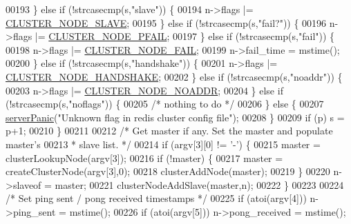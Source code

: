 \begin{DoxyCode}
{{00193             \} \textcolor{keywordflow}{else} \textcolor{keywordflow}{if} (!strcasecmp(s,\textcolor{stringliteral}{"slave"})) \{
00194                 n->flags |= \hyperlink{cluster_8h_a34b7bfd1f810397be68c3b5d13d4d134}{CLUSTER\_NODE\_SLAVE};
00195             \} \textcolor{keywordflow}{else} \textcolor{keywordflow}{if} (!strcasecmp(s,\textcolor{stringliteral}{"fail?"})) \{
00196                 n->flags |= \hyperlink{cluster_8h_a5306c1ae8988b8be0a1a02bd9162dfa1}{CLUSTER\_NODE\_PFAIL};
00197             \} \textcolor{keywordflow}{else} \textcolor{keywordflow}{if} (!strcasecmp(s,\textcolor{stringliteral}{"fail"})) \{
00198                 n->flags |= \hyperlink{cluster_8h_ad211e85c7baf8a5a59acd747e4e9005a}{CLUSTER\_NODE\_FAIL};
00199                 n->fail\_time = mstime();
00200             \} \textcolor{keywordflow}{else} \textcolor{keywordflow}{if} (!strcasecmp(s,\textcolor{stringliteral}{"handshake"})) \{
00201                 n->flags |= \hyperlink{cluster_8h_a60571342a067f1e5772a04b36feff6a6}{CLUSTER\_NODE\_HANDSHAKE};
00202             \} \textcolor{keywordflow}{else} \textcolor{keywordflow}{if} (!strcasecmp(s,\textcolor{stringliteral}{"noaddr"})) \{
00203                 n->flags |= \hyperlink{cluster_8h_a2bbed8bf0615871a01ca8b7f691b56d8}{CLUSTER\_NODE\_NOADDR};
00204             \} \textcolor{keywordflow}{else} \textcolor{keywordflow}{if} (!strcasecmp(s,\textcolor{stringliteral}{"noflags"})) \{
00205                 \textcolor{comment}{/* nothing to do */}
00206             \} \textcolor{keywordflow}{else} \{
00207                 \hyperlink{server_8h_a11cc378e7778a830b41240578de3b204}{serverPanic}(\textcolor{stringliteral}{"Unknown flag in redis cluster config file"});
00208             \}
00209             \textcolor{keywordflow}{if} (p) s = p+1;
00210         \}
00211 
00212         \textcolor{comment}{/* Get master if any. Set the master and populate master's}
00213 \textcolor{comment}{         * slave list. */}
00214         \textcolor{keywordflow}{if} (argv[3][0] != \textcolor{stringliteral}{'-'}) \{
00215             master = clusterLookupNode(argv[3]);
00216             \textcolor{keywordflow}{if} (!master) \{
00217                 master = createClusterNode(argv[3],0);
00218                 clusterAddNode(master);
00219             \}
00220             n->slaveof = master;
00221             clusterNodeAddSlave(master,n);
00222         \}
00223 
00224         \textcolor{comment}{/* Set ping sent / pong received timestamps */}
00225         \textcolor{keywordflow}{if} (atoi(argv[4])) n->ping\_sent = mstime();
00226         \textcolor{keywordflow}{if} (atoi(argv[5])) n->pong\_received = mstime();
}}
\end{DoxyCode}
